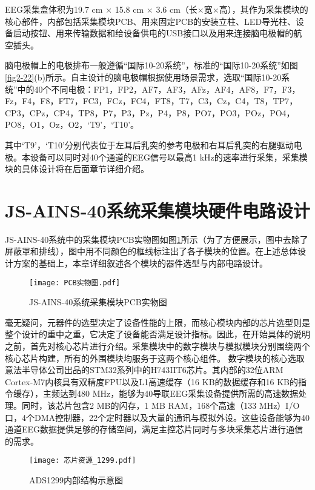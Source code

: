 EEG采集盒体积为19.7 cm $ \times $ 15.8 cm $ \times $ 3.6 cm（长$\times$宽$\times$高），其作为采集模块的核心部件，内部包括采集模块PCB、用来固定PCB的安装立柱、LED导光柱、设备启动按钮、用来传输数据和给设备供电的USB接口以及用来连接脑电极帽的航空插头。

脑电极帽上的电极排布一般遵循“国际10-20系统”，标准的“国际10-20系统”如图\ref{fig2-22}(b)所示。自主设计的脑电极帽根据使用场景需求，选取“国际10-20系统”中的40个不同电极：FP1，FP2，AF7，AF3，AFz，AF4，AF8，F7，F3，Fz，F4，F8，FT7，FC3，FCz，FC4，FT8，T7，C3，Cz，C4，T8，TP7，CP3，CPz，CP4，TP8，P7，P3，Pz，P4，P8，PO7，PO3，POz，PO4，PO8，O1，Oz，O2，‘T9’，‘T10’。

其中‘T9’，‘T10’分别代表位于左耳后乳突的参考电极和右耳后乳突的右腿驱动电极。本设备可以同时对40个通道的EEG信号以最高1 kHz的速率进行采集，采集模块的具体设计将在后面章节详细介绍。

\section{JS-AINS-40系统采集模块硬件电路设计}

JS-AINS-40系统中的采集模块PCB实物图如图\ref{fig2-4}所示（为了方便展示，图中去除了屏蔽罩和排线），图中用不同颜色的框线标注出了各子模块的位置。在上述总体设计方案的基础上，本章详细叙述各个模块的器件选型与内部电路设计。
\begin{figure}[h!]
	\centering
	\texttt{[image: PCB实物图.pdf]}
	\caption{JS-AINS-40系统采集模块PCB实物图}
	\label{fig2-4}
\end{figure}

毫无疑问，元器件的选型决定了设备性能的上限，而核心模块内部的芯片选型则是整个设计的重中之重，它决定了设备能否满足设计指标。因此，在开始具体的说明之前，首先对核心芯片进行介绍。采集模块中的数字模块与模拟模块分别围绕两个核心芯片构建，所有的外围模块均服务于这两个核心组件。
数字模块的核心选取意法半导体公司出品的STM32系列中的H743IIT6芯片。其内部的32位ARM Cortex-M7内核具有双精度FPU以及L1高速缓存（16 KB的数据缓存和16 KB的指令缓存），主频达到480 MHz，能够为40导联EEG采集设备提供所需的高速数据处理。同时，该芯片包含2 MB的闪存，1 MB RAM，168个高速（133 MHz）I/O口，4个DMA控制器，22个定时器以及大量的通讯与模拟外设。这些设备能够为40通道EEG数据提供足够的存储空间，满足主控芯片同时与多块采集芯片进行通信的需求。%
\begin{figure}[!h]
	\centering
	\texttt{[image: 芯片资源\_1299.pdf]}
	\caption{ADS1299内部结构示意图}
	\label{fig2-2}
\end{figure}

